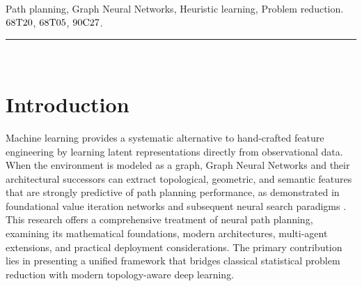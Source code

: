 \documentclass[10pt,twoside]{article}
\numberwithin{equation}{section}
\begin{document}
	




	Path planning, Graph Neural Networks, Heuristic learning, Problem reduction. \\


	 $\rm 68T20$, $\rm 68T05$, $\rm 90C27$. \\


	\hspace{1cm}\rule{\textwidth}{0.2mm}\\




	\section{Introduction}


	


	Machine learning provides a systematic alternative to hand-crafted feature engineering by learning latent representations directly from observational data. When the environment is modeled as a graph, Graph Neural Networks and their architectural successors can extract topological, geometric, and semantic features that are strongly predictive of path planning performance, as demonstrated in foundational value iteration networks \cite{tamar2016} and subsequent neural search paradigms \cite{yonetani2021, li2018combinatorial}. This research offers a comprehensive treatment of neural path planning, examining its mathematical foundations, modern architectures, multi-agent extensions, and practical deployment considerations. The primary contribution lies in presenting a unified framework that bridges classical statistical problem reduction with modern topology-aware deep learning. %
\end{document}
